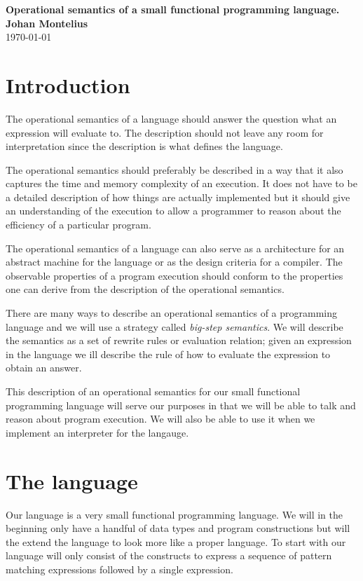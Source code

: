 \documentclass[a4paper,11pt]{article}
\newcommand{\nnsection}[1]{
\section*{#1}
\addcontentsline{toc}{section}{#1}
}
\begin{document}
\begin{center}
\vspace{20pt}
\textbf{\large Operational semantics of a small functional programming language.}\\
\vspace{10pt}
\textbf{Johan Montelius}\\
\vspace{10pt}
\today{}
\end{center}


\nnsection{Introduction}

The operational semantics of a language should answer the question
what an expression will evaluate to. The description should not leave
any room for interpretation since the description is what defines the
language.

The operational semantics should preferably be described in a way that
it also captures the time and memory complexity of an execution. It
does not have to be a detailed description of how things are actually
implemented but it should give an understanding of the execution to
allow a programmer to reason about the efficiency of a particular
program.

The operational semantics of a language can also serve as a
architecture for an abstract machine for the language or as the design
criteria for a compiler. The observable properties of a program
execution should conform to the properties one can derive from the
description of the operational semantics.

There are many ways to describe an operational semantics of a
programming language and we will use a strategy called {\em big-step
  semantics}. We will describe the semantics as a set of rewrite rules
or evaluation relation; given an expression in the language we ill
describe the rule of how to evaluate the expression to obtain an
answer.

This description of an operational semantics for our small functional
programming language will serve our purposes in that we will be able
to talk and reason about program execution. We will also be able to
use it when we implement an interpreter for the langauge.


\section{The language}

Our language is a very small functional programming language. We will
in the beginning only have a handful of data types and program
constructions but will the extend the language to look more like a
proper language. To start with our language will only consist of the
constructs to express a sequence of pattern matching expressions
followed by a single expression.
\end{document}
